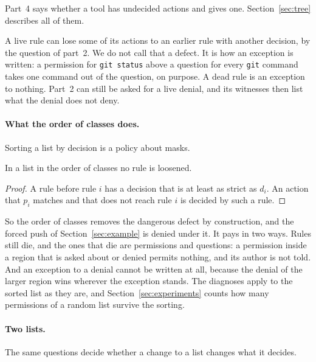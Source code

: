 \documentclass[acmsmall,nonacm,screen]{acmart}
\begin{document}
Part~4 says whether a tool has undecided actions and gives one. Section~\ref{sec:tree}
describes all of them.

\begin{remark}[Exceptions]
A live rule can lose some of its actions to an earlier rule with another decision, by the
question of part~2. We do not call that a defect. It is how an exception is written: a
permission for \texttt{git status} above a question for every \texttt{git} command takes one
command out of the question, on purpose. A dead rule is an exception to nothing. Part~2 can
still be asked for a live denial, and its witnesses then list what the denial does not deny.
\end{remark}

\paragraph{What the order of classes does.} Sorting a list by decision is a policy about
masks.

\begin{proposition}[Classes]\label{prop:classes}
In a list in the order of classes no rule is loosened.
\end{proposition}

\begin{proof}
A rule before rule $i$ has a decision that is at least as strict as $d_i$. An action that
$p_i$ matches and that does not reach rule $i$ is decided by such a rule.
\end{proof}

So the order of classes removes the dangerous defect by construction, and the forced push of
Section~\ref{sec:example} is denied under it. It pays in two ways. Rules still die, and the
ones that die are permissions and questions: a permission inside a region that is asked about
or denied permits nothing, and its author is not told. And an exception to a denial cannot be
written at all, because the denial of the larger region wins wherever the exception stands.
The diagnoses apply to the sorted list as they are, and Section~\ref{sec:experiments} counts
how many permissions of a random list survive the sorting.

\paragraph{Two lists.} The same questions decide whether a change to a list changes what it
decides.
\end{document}
